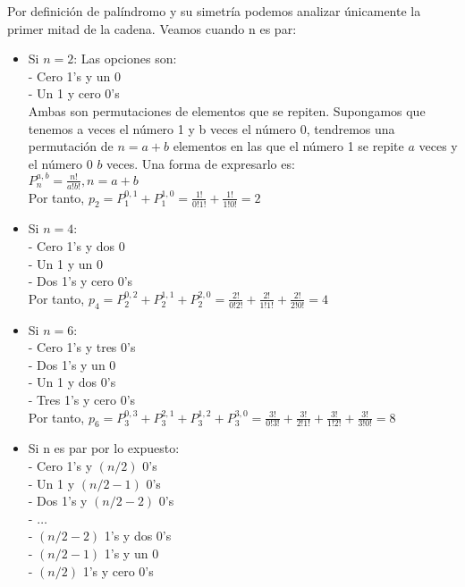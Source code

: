 \documentclass{article}
\begin{document}
\begin{enumerate}
\begin{itemize}
\begin{itemize}
        \end{itemize}
    \end{itemize}
    Por definición de palíndromo y su simetría podemos analizar únicamente la primer mitad de la cadena. Veamos cuando n es par:
    \begin{itemize}
        \item Si \(n = 2\): Las opciones son:
        \\- Cero 1's y un 0
        \\- Un 1 y cero 0's
        \\Ambas son permutaciones de elementos que se repiten. Supongamos que tenemos a veces el número 1 y b veces el número 0, tendremos una permutación de \(n = a+b\) elementos en las que el número 1 se repite \(a\) veces y el número 0 \(b\) veces. Una forma de expresarlo es:
        \\\(P_{n}^{a,b}=\frac{n!}{a!b!}, n = a+b\)
        \\Por tanto, \(p_2=P_{1}^{0,1}+P_{1}^{1,0}=\frac{1!}{0!1!}+\frac{1!}{1!0!}=2\)
        \item Si \(n = 4\):
        \\- Cero 1's y dos 0
        \\- Un 1 y un 0
        \\- Dos 1's y cero 0's
        \\Por tanto, \(p_4=P_{2}^{0,2}+P_{2}^{1,1}+P_{2}^{2,0}=\frac{2!}{0!2!}+\frac{2!}{1!1!}+\frac{2!}{2!0!}=4\)
        \item Si \(n = 6\):
        \\- Cero 1's y tres 0's
        \\- Dos 1's y un 0
        \\- Un 1 y dos 0's
        \\- Tres 1's y cero 0's
        \\Por tanto, \(p_6=P_{3}^{0,3}+P_{3}^{2,1}+P_{3}^{1,2}+P_{3}^{3,0}= \frac{3!}{0!3!}+\frac{3!}{2!1!}+\frac{3!}{1!2!}+\frac{3!}{3!0!}=8\)
        \item Si n es par por lo expuesto:
        \\- Cero 1's y \((n/2)\) 0's
        \\- Un 1 y \((n/2 -1)\) 0's
        \\- Dos 1's y \((n/2 - 2)\) 0's
        \\- \(\ldots\)
        \\- \((n/2 -2)\) 1's y dos 0's
        \\- \((n/2 - 1)\) 1's y un 0
        \\- \((n/2)\) 1's y cero 0's

\end{itemize}
\end{enumerate}
\end{document}
